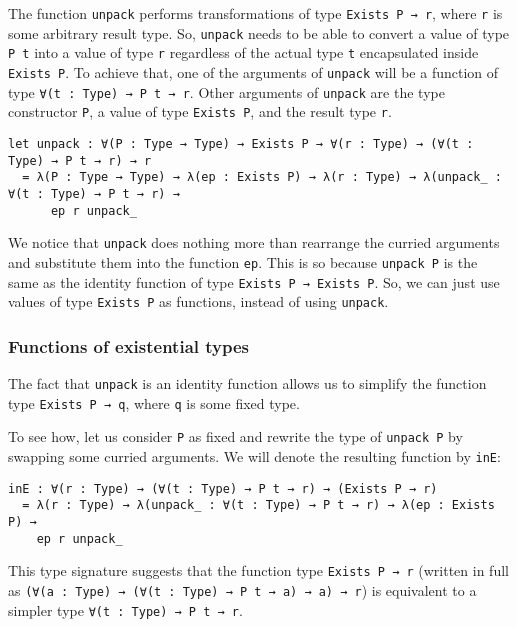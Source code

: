 The function \lstinline!unpack! performs transformations of type \lstinline!Exists P → r!, where \lstinline!r! is some arbitrary result type.
So, \lstinline!unpack! needs to be able to convert a value of type \lstinline!P t! into a value of type \lstinline!r! regardless of the actual type \lstinline!t! encapsulated inside \lstinline!Exists P!.
To achieve that, one of the arguments of \lstinline!unpack! will be a function of type \lstinline!∀(t : Type) → P t → r!.
Other arguments of \lstinline!unpack! are the type constructor \lstinline!P!, a value of type \lstinline!Exists P!, and the result type \lstinline!r!.


\begin{lstlisting}[language=Dhall]
let unpack : ∀(P : Type → Type) → Exists P → ∀(r : Type) → (∀(t : Type) → P t → r) → r 
  = λ(P : Type → Type) → λ(ep : Exists P) → λ(r : Type) → λ(unpack_ : ∀(t : Type) → P t → r) →
      ep r unpack_
\end{lstlisting}


We notice that \lstinline!unpack! does nothing more than rearrange the curried arguments and substitute them into the function \lstinline!ep!.
This is so because \lstinline!unpack P! is the same as the identity function of type \lstinline!Exists P → Exists P!.
So, we can just use values of type \lstinline!Exists P! as functions, instead of using \lstinline!unpack!.


\subsubsection{Functions of existential types}


The fact that \lstinline!unpack! is an identity function allows us to simplify the function type \lstinline!Exists P → q!, where \lstinline!q! is some fixed type.


To see how, let us consider \lstinline!P! as fixed and rewrite the type of \lstinline!unpack P! by swapping some curried arguments.
We will denote the resulting function by \lstinline!inE!:


\begin{lstlisting}[language=Dhall]
inE : ∀(r : Type) → (∀(t : Type) → P t → r) → (Exists P → r)
  = λ(r : Type) → λ(unpack_ : ∀(t : Type) → P t → r) → λ(ep : Exists P) →
    ep r unpack_
\end{lstlisting}


This type signature suggests that the function type \lstinline!Exists P → r! (written in full as \lstinline!(∀(a : Type) → (∀(t : Type) → P t → a) → a) → r!) is equivalent to a simpler type \lstinline!∀(t : Type) → P t → r!.


